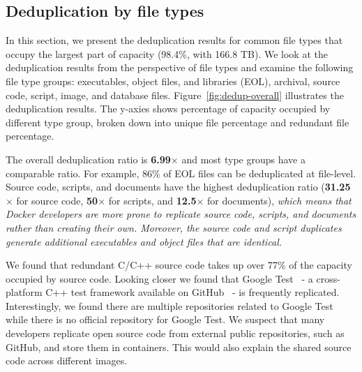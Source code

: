 
\subsection{Deduplication by file types}



%
%
In this section, we present the deduplication results for common file
types that occupy the largest part of capacity (98.4\%, with 166.8 TB).
We look at the deduplication results from the perspective of file types and 
examine the following file type groups: executables, object files,
and libraries (EOL), archival, source code, script, image, and database files. 
%
Figure~\ref{fig:dedup-overall} illustrates the deduplication results.
The y-axies shows percentage of capacity occupied by different type group,
broken down into unique file percentage and redundant file percentage.

The overall deduplication ratio is \textbf{6.99$\times$} and most
type groups have a comparable ratio.
%
For example, 86\% of EOL files can be deduplicated at file-level.
%
Source code, scripts, and documents have the highest deduplication ratio
(\textbf{31.25$\times$} for source code, \textbf{50$\times$} for scripts,
and \textbf{12.5$\times$} for documents), \textit{which means that
Docker developers are more prone to replicate source code, scripts, and
documents rather than creating their own. Moreover, the source code and
script duplicates generate additional executables and object files that are
identical.} 
%

We found that redundant C/C++ source code takes up over 77\%
of the capacity occupied by source code. Looking closer we found
that Google Test~\cite{googletest} - a cross-platform C++ test
framework available on GitHub~\cite{github} - is frequently replicated.
%
Interestingly, we found there are multiple repositories  related to Google
Test while there is no official repository for Google Test. We suspect that
many developers replicate open source code from external public repositories,
such as GitHub, and store them in containers. This would also explain the shared
source code across different images.

